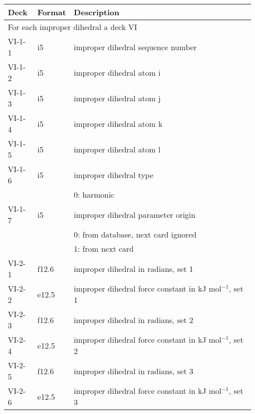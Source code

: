 \begin{center}
\begin{tabular*}{150mm}{p{12mm}p{12mm}l}
\hline\hline
Deck & Format & Description \\ \hline
\multicolumn{3}{l}{For each improper dihedral a deck VI} \\
VI-1-1 & i5     & improper dihedral sequence number \\
VI-1-2 & i5     & improper dihedral atom i \\
VI-1-3 & i5     & improper dihedral atom j \\
VI-1-4 & i5     & improper dihedral atom k \\
VI-1-5 & i5     & improper dihedral atom l \\
VI-1-6 & i5     & improper dihedral type \\
       &        & 0: harmonic\\
VI-1-7 & i5     & improper dihedral parameter origin\\
       &        & 0: from database, next card ignored \\
       &        & 1: from next card\\
VI-2-1 & f12.6  & improper dihedral in radians, set 1\\
VI-2-2 & e12.5  & improper dihedral force constant in kJ mol$^{-1}$, set 1 \\
VI-2-3 & f12.6  & improper dihedral in radians, set 2\\
VI-2-4 & e12.5  & improper dihedral force constant in kJ mol$^{-1}$, set 2 \\
VI-2-5 & f12.6  & improper dihedral in radians, set 3\\
VI-2-6 & e12.5  & improper dihedral force constant in kJ mol$^{-1}$, set 3 \\
\hline\hline
\end{tabular*}
\end{center}
